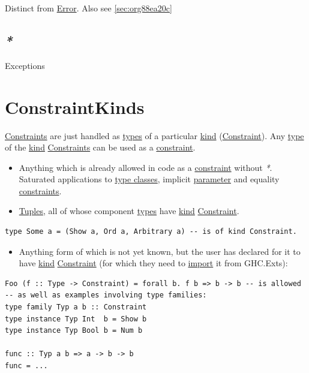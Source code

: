 \documentclass[a4paper,14pt,oneside]{book}
\begin{document}
Distinct from \hyperref[org76aac60]{Error}. Also see \ref{sec:org88ea20c}

\section{\emph{*}}
\label{sec:org99af386}

\label{org3764b39}Exceptions

\chapter{\label{org14482c9}ConstraintKinds}
\label{sec:orge9c957c}
\hyperref[org3d5d830]{Constraints} are just handled as \hyperref[org3769b77]{types} of a particular \hyperref[org3ab5e63]{kind} (\hyperref[org45b0f0c]{Constraint}).
Any \hyperref[org02707c5]{type} of the \hyperref[org3ab5e63]{kind} \hyperref[org3d5d830]{Constraints} can be used as a \hyperref[org45b0f0c]{constraint}.
\begin{itemize}
\item Anything which is already allowed in code as a \hyperref[org45b0f0c]{constraint} without \emph{*}. Saturated applications to \hyperref[org9ad7186]{type classes}, implicit \hyperref[org2c11311]{parameter} and equality \hyperref[org3d5d830]{constraints}.
\item \hyperref[org8828756]{Tuples}, all of whose component \hyperref[org3769b77]{types} have \hyperref[org3ab5e63]{kind} \hyperref[org45b0f0c]{Constraint}.
\end{itemize}
\begin{verbatim}
type Some a = (Show a, Ord a, Arbitrary a) -- is of kind Constraint.
\end{verbatim}
\begin{itemize}
\item Anything form of which is not yet known, but the user has declared for it to have \hyperref[org3ab5e63]{kind} \hyperref[org45b0f0c]{Constraint} (for which they need to \hyperref[org17ec684]{import} it from GHC.Exts):
\end{itemize}
\begin{verbatim}
Foo (f :: Type -> Constraint) = forall b. f b => b -> b -- is allowed
-- as well as examples involving type families:
type family Typ a b :: Constraint
type instance Typ Int  b = Show b
type instance Typ Bool b = Num b

func :: Typ a b => a -> b -> b
func = ...
\end{verbatim}
\end{document}
